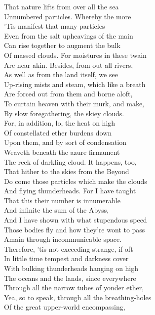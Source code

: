 That nature lifts from over all the sea\\
Unnumbered particles. Whereby the more\\
'Tis manifest that many particles\\
Even from the salt upheavings of the main\\
Can rise together to augment the bulk\\
Of massed clouds. For moistures in these twain\\
Are near akin. Besides, from out all rivers,\\
As well as from the land itself, we see\\
Up-rising mists and steam, which like a breath\\
Are forced out from them and borne aloft,\\
To curtain heaven with their murk, and make,\\
By slow foregathering, the skiey clouds.\\
For, in addition, lo, the heat on high\\
Of constellated ether burdens down\\
Upon them, and by sort of condensation\\
Weaveth beneath the azure firmament\\
The reek of darkling cloud. It happens, too,\\
That hither to the skies from the Beyond\\
Do come those particles which make the clouds\\
And flying thunderheads. For I have taught\\
That this their number is innumerable\\
And infinite the sum of the Abyss,\\
And I have shown with what stupendous speed\\
Those bodies fly and how they're wont to pass\\
Amain through incommunicable space.\\
Therefore, 'tis not exceeding strange, if oft\\
In little time tempest and darkness cover\\
With bulking thunderheads hanging on high\\
The oceans and the lands, since everywhere\\
Through all the narrow tubes of yonder ether,\\
Yea, so to speak, through all the breathing-holes\\
Of the great upper-world encompassing,\\

